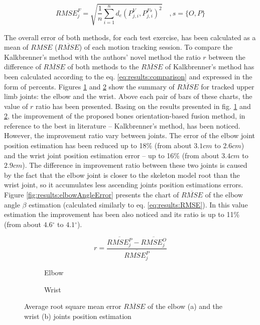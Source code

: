 \documentclass[sensors,article,submit,moreauthors,pdftex,10pt,a4paper]{mdpi}
\newcommand{\degree}{\ensuremath{{}^{\circ}}\xspace}
\begin{document}
	\begin{equation}
		{RMSE}^F_j = \sqrt{\frac{1}{n}\sum_{i=1}^{n}{d_e(P^V_{j,i}, P^{Fs}_{j,i})^2}}\quad , s = \{O,P\}
		\label{eq:results:RMSE}
	\end{equation}
		
	The overall error of both methods, for each test exercise, has been calculated as a mean of $RMSE$ ($\overline{RMSE}$) of each motion tracking session. To compare the Kalkbrenner’s method with the authors’ novel method the ratio $r$ between the difference of $\overline{RMSE}$ of both methods to the $\overline{RMSE}$ of Kalkbrenner’s method has been calculated according to the eq. \ref{eq:results:comparison} and expressed in the form of percents. Figures \ref{fig:results:positionError:a} and \ref{fig:results:positionError:b} show the summary of  $\overline{RMSE}$ for tracked upper limb joints: the elbow and the wrist. Above each pair of bars of these charts, the value of $r$ ratio has been presented. Basing on the results presented in fig. \ref{fig:results:positionError:a} and \ref{fig:results:positionError:b}, the improvement of the proposed bones orientation-based fusion method, in reference to the best in literature -- Kalkbrenner’s method, has been noticed. However, the improvement ratio vary between joints. The error of the elbow joint position estimation has been reduced up to 18\% (from about $3.1cm$ to $2.6cm$) and the wrist joint position estimation error -- up to 16\% (from about $3.4cm$ to $2.9cm$). The difference in improvement ratio between these two joints is caused by the fact that the elbow joint is closer to the skeleton model root than the wrist joint, so it accumulates less ascending joints position estimations errors. Figure \ref{fig:results:elbowAngleError} presents the chart of $\overline{RMSE}$ of the elbow angle $\beta$ estimation (calculated similarly to eq. \ref{eq:results:RMSE}). In this value estimation the improvement has been also noticed and its ratio is up to 11\% (from about $4.6\degree$ to $4.1\degree$).
		
	\begin{equation}
		r = \frac{\overline{RMSE^P_j} - \overline{RMSE^O_j}}{\overline{RMSE^P_j}}
		\label{eq:results:comparison}
	\end{equation}
		
	\begin{figure}[H] %
		\centering
		\begin{subfigure}[b]{0.49\textwidth}
			\centering
			
			\caption{Elbow}
			\label{fig:results:positionError:a}
		\end{subfigure} \hfill
		\begin{subfigure}[b]{0.49\textwidth}
			\centering
			
			\caption{Wrist}
			\label{fig:results:positionError:b}
		\end{subfigure}
		\caption{Average root square mean error $\overline{RMSE}$ of the elbow (a) and the wrist (b) joints position estimation}
		\label{fig:results:positionError}
	\end{figure}   
		
\end{document}
